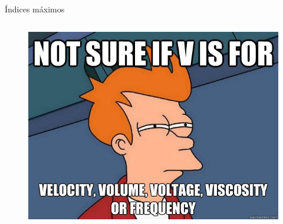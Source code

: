 \documentclass[a4paper,10pt]{beamer}
\begin{document}
\begin{frame}{Índices máximos}
\begin{columns}[c]
\begin{figure}
 \center
 \includegraphics[scale=0.22]{fig26}
\end{figure}
\end{columns}

\end{frame}
\end{document}
